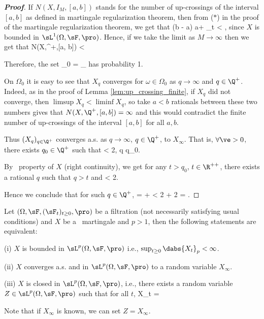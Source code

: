 \begin{proof}[\bf Proof]
If $N(X,I_M,[a, b])$ stands for the number of up-crossings of the interval $[a, b]$ as defined in martingale regularization theorem, then from ($*$) in the proof of the martingale regularization theorem, we get that
\be
(b - a)\E{} \leq \E{} \leq \E{} \leq a+ \sup_{t} \E{} < \infty,
\ee
since $X$ is bounded in $\sL^1(\Omega,\sF,\pro)$. Hence, if we take the limit as $M \to \infty$ then we get that
\be
N(X,\Q^+,[a, b]) < \infty \ 
\ee

Therefore, the set
\be
\Omega_0 = \bigcap_{} 
\ee
has probability 1.

On $\Omega_0$ it is easy to see that $X_q$ converges for $\omega \in \Omega_0$ as $q \to \infty$ and $q \in \Q^+$. Indeed, as in the proof of Lemma \ref{lem:up_crossing_finite}, if $X_q$ did not converge, then $\limsup X_q < \liminf X_q$, so take $a<b$ rationals between these two numbers gives that $N(X,\Q^+,[a,b]) = \infty$ and this would contradict the finite number of up-crossings of the interval $[a, b]$ for all $a,b$.%

Thus $(X_q)_{q\in \Q^+}$ converges a.s. as $q \to \infty$, $q \in \Q^+$, to $X_\infty$. That is, $\forall \ve > 0$, there exists $q_0 \in \Q^+$ such that
\be
{} < \frac {\ve}2, \quad \forall q \geq q_0.
\ee

By \cadlag\ property of $X$ (right continuity), we get for any $t > q_0$, $t\in \R^{++}$, there exists a rational $q$ such that $q>t$ and
\be
{} < \frac {\ve}2.
\ee

Hence we conclude that for such $q\in \Q^+$,
\be
{} =  \leq {} +  < \frac {\ve}2 + \frac{\ve}2 = \ve.
\ee
\end{proof}

\begin{theorem}\label{thm:martingale_bounded_lp_as_lp_closed_continuous}
Let $(\Omega,\sF,(\sF_t)_{t\geq 0}, \pro)$ be a filtration (not necessarily satisfying usual conditions) and $X$ be a \cadlag\ martingale and $p > 1$, then the following statements are equivalent:
\ben
\item [(i)] $X$ is bounded in $\sL^p(\Omega,\sF,\pro)$ i.e., $\sup_{t\geq 0} \dabs{X_t}_p < \infty$.
\item [(ii)] $X$ converges a.s. and in $\sL^p(\Omega,\sF,\pro)$ to a random variable $X_\infty$.
\item [(iii)] $X$ is closed in $\sL^p(\Omega,\sF,\pro)$, i.e., there exists a random variable $Z \in \sL^p(\Omega,\sF,\pro)$ such that for all $t$,
\be
X_t = \E{}\quad {}
\ee

Note that if $X_\infty$ is known, we can set $Z = X_\infty$.
    \een
\end{theorem}

